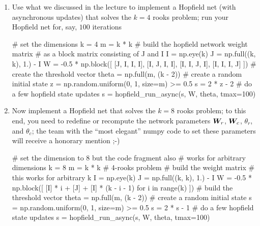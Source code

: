 \begin{enumerate}
\item Use what we discussed in the lecture to implement a Hopfield net (with asynchronous updates) that solves the $k=4$ rooks problem; run your Hopfield net for, say, $100$ iterations

\begin{python}
# set the dimensions
k = 4
m = k * k
# build the hopfield network weight matrix
# as a block matrix consisting of J and I
I = np.eye(k)
J = np.full((k, k), 1.) - I
W = -0.5 * np.block([
    [J, I, I, I],
    [I, J, I, I],
    [I, I, J, I],
    [I, I, I, J]
])
# create the threshold vector
theta = np.full(m, (k - 2))
# create a random initial state
z = np.random.uniform(0, 1, size=m) >= 0.5
s = 2 * z - 2
# do a few hopfield state updates
s = hopfield_run_async(s, W, theta, tmax=100)
\end{python}

\item Now implement a Hopfield net that solves the $k=8$ rooks problem; to this end, you need to redefine or recompute the network parameters $\bm{W}_r$, $\bm{W}_c$, $\theta_r$, and $\theta_c$; the team with the ``most elegant'' numpy code to set these parameters will receive a honorary mention ;-)

\begin{python}
# set the dimension to 8 but the code fragment also
# works for arbitrary dimensions
k = 8
m = k * k
# 4-rooks problem
# build the weight matrix
# this works for arbitrary k
I = np.eye(k)
J = np.full((k, k), 1.) - I
W = -0.5 * np.block([
    [I] * i + [J] + [I] * (k - i - 1)
    for i in range(k)
])
# build the threshold vector
theta = np.full(m, (k - 2))
# create a random initial state
s = np.random.uniform(0, 1, size=m) >= 0.5
s = 2 * s - 1
# do a few hopfield state updates
s = hopfield_run_async(s, W, theta, tmax=100)
\end{python}


\end{enumerate}
